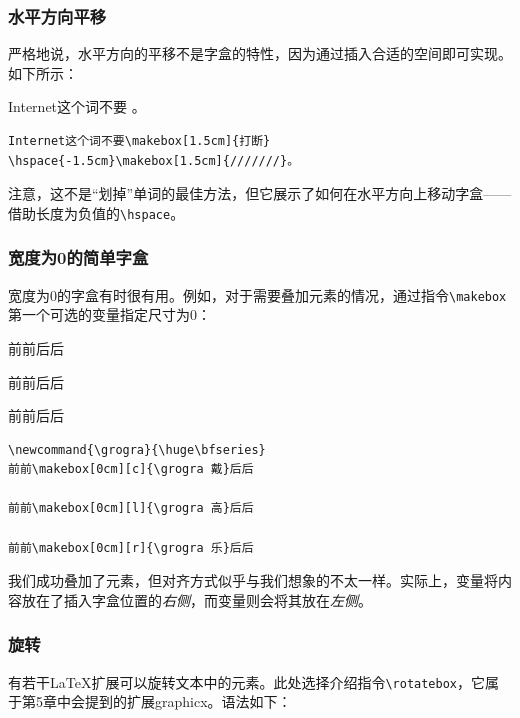 \subsubsection{水平方向平移}

严格地说，水平方向的平移不是字盒的特性，因为通过插入合适的空间即可实现。如下所示：

\begin{codelist}[4.13]{
  Internet这个词不要
\hspace{-1.5cm}\makebox[1.5cm]{///////}。
}
\begin{verbatim}
Internet这个词不要\makebox[1.5cm]{打断}
\hspace{-1.5cm}\makebox[1.5cm]{///////}。\end{verbatim}
\end{codelist}

注意，这不是``划掉''单词的最佳方法，但它展示了如何在水平方向上移动字盒——借助长度为负值的\verb|\hspace|。

\subsubsection{宽度为0的简单字盒}

宽度为0的字盒有时很有用。例如，对于需要叠加元素的情况，通过指令\verb|\makebox|第一个可选的变量指定尺寸为0：

\begin{codelist}[4.14]{
  \newcommand{\grogra}{\huge\bfseries}
前前\makebox[0cm][c]{\grogra 戴}后后

前前\makebox[0cm][l]{\grogra 高}后后

前前\makebox[0cm][r]{\grogra 乐}后后
}
\begin{verbatim}
\newcommand{\grogra}{\huge\bfseries}
前前\makebox[0cm][c]{\grogra 戴}后后

前前\makebox[0cm][l]{\grogra 高}后后

前前\makebox[0cm][r]{\grogra 乐}后后\end{verbatim}
\end{codelist}

我们成功叠加了元素，但对齐方式似乎与我们想象的不太一样。实际上，变量将内容放在了插入字盒位置的\emph{右侧}，而变量则会将其放在\emph{左侧}。

\subsubsection{旋转}

有若干\LaTeX 扩展可以旋转文本中的元素。此处选择介绍指令\verb|\rotatebox|，它属于第5章中会提到的扩展\textsf{graphicx}。语法如下：

